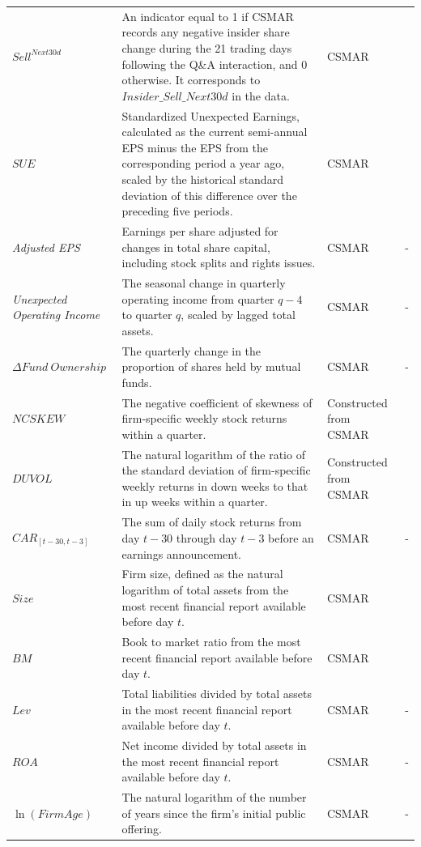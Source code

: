 \documentclass[12pt]{article}
\begin{document}
\begin{xltabular}{\textwidth}{@{} >{\RaggedRight\arraybackslash}p{3.1cm} >{\RaggedRight\arraybackslash}X >{\RaggedRight\arraybackslash}p{2.6cm} >{\RaggedRight\arraybackslash}p{2.8cm} @{}}
   \\
  \midrule
  $Sell^{Next30d}$ & An indicator equal to 1 if CSMAR records any negative insider share change during the 21 trading days following the Q\&A interaction, and 0 otherwise. It corresponds to $Insider\_Sell\_Next30d$ in the data. & CSMAR & \cite{cheng2006insider} \\
  \addlinespace
  $SUE$ & Standardized Unexpected Earnings, calculated as the current semi-annual EPS minus the EPS from the corresponding period a year ago, scaled by the historical standard deviation of this difference over the preceding five periods. & CSMAR & \cite{bernard1989post} \\
  \addlinespace
  \textit{Adjusted EPS} & Earnings per share adjusted for changes in total share capital, including stock splits and rights issues. & CSMAR & - \\
  \addlinespace
  \textit{Unexpected Operating Income} & The seasonal change in quarterly operating income from quarter $q-4$ to quarter $q$, scaled by lagged total assets. & CSMAR & - \\
  \addlinespace
  $\Delta Fund\ Ownership$ & The quarterly change in the proportion of shares held by mutual funds. & CSMAR & - \\
  \addlinespace
  $NCSKEW$ & The negative coefficient of skewness of firm-specific weekly stock returns within a quarter. & Constructed from CSMAR & \cite{chen2001,hutton2009} \\
  \addlinespace
  $DUVOL$ & The natural logarithm of the ratio of the standard deviation of firm-specific weekly returns in down weeks to that in up weeks within a quarter. & Constructed from CSMAR & \cite{chen2001,hutton2009} \\
  \addlinespace
  $CAR_{[t-30,t-3]}$ & The sum of daily stock returns from day $t-30$ through day $t-3$ before an earnings announcement. & CSMAR & - \\
  \addlinespace
  $Size$ & Firm size, defined as the natural logarithm of total assets from the most recent financial report available before day $t$. & CSMAR & \cite{fama1993common} \\
  \addlinespace
  $BM$ & Book to market ratio from the most recent financial report available before day $t$. & CSMAR & \cite{fama1993common} \\
  \addlinespace
  $Lev$  & Total liabilities divided by total assets in the most recent financial report available before day $t$. & CSMAR & - \\
  \addlinespace
  $ROA$ & Net income divided by total assets in the most recent financial report available before day $t$. & CSMAR & - \\
  \addlinespace
  $\ln(\textit{FirmAge})$ & The natural logarithm of the number of years since the firm's initial public offering. & CSMAR & - \\
  \midrule


\end{xltabular}
\end{document}
